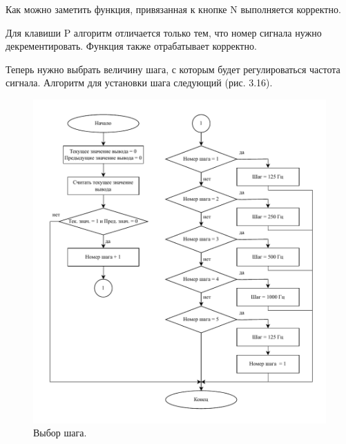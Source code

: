 	Как можно заметить функция, привязанная к кнопке N выполняется корректно.

	Для клавиши P алгоритм отличается только тем, что номер сигнала нужно декрементировать. Функция также отрабатывает корректно.
	
	Теперь нужно выбрать величину шага, с которым будет регулироваться частота сигнала. Алгоритм для установки шага следующий (рис. 3.16).
	
	\begin{figure}[H]
    \centering
    \includegraphics[width=1\textwidth]{../image/step_select.pdf}
    \caption{Выбор шага.}
	\end{figure}	
	
